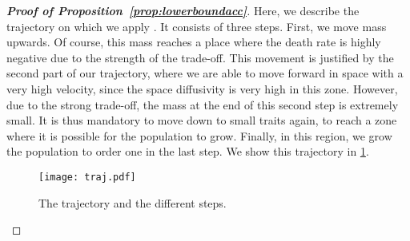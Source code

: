 \documentclass[11pt]{article}    %
\begin{document}
\begin{proof}[{\bf Proof of Proposition~\ref{prop:lowerboundacc}}]


Here, we describe the trajectory on which we apply . It consists of three steps. First, we move mass upwards. Of course, this mass reaches a place where the death rate is highly negative due to the strength of the trade-off. This movement is justified by the second part of our trajectory, where we are able to move forward in space with a very high velocity, since the space diffusivity is very high in this zone. However, due to the strong trade-off, the mass at the end of this second step is extremely small. It is thus mandatory to move down to small traits again, to reach a zone where it is possible for the population to grow. Finally, in this region, we grow the population to order one in the last step. We show this trajectory in \cref{fig:trajectory}.



\begin{figure}[h]
\begin{center}
\texttt{[image: traj.pdf]}
\caption{The trajectory and the different steps.}
\label{fig:trajectory}
\end{center}
\end{figure}









\end{proof}
\end{document}
